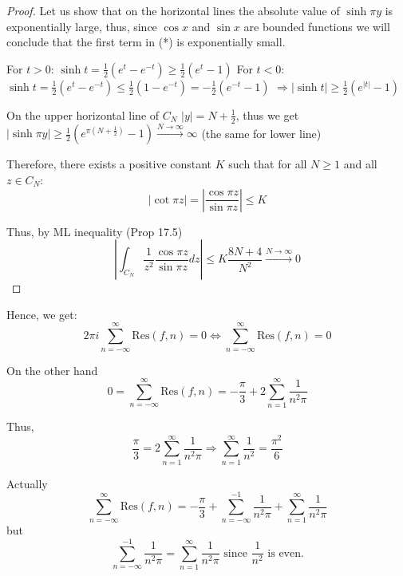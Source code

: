 \begin{soln}
\begin{proof}
Let us show that on the horizontal lines the absolute value of $\sinh \pi y$ is exponentially large, thus, since $\cos x$ and $\sin x$ are bounded functions we will conclude that the first term in (*) is exponentially small.

For $t > 0$: $\sinh t = \frac{1}{2} (e^t - e^{-t}) \ge \frac{1}{2} (e^t - 1)$
For $t < 0$: $\sinh t = \frac{1}{2} (e^t - e^{-t}) \le \frac{1}{2} (1 - e^{-t}) = -\frac{1}{2} (e^{-t} - 1)$
$\Rightarrow |\sinh t| \ge \frac{1}{2} (e^{|t|} - 1)$

On the upper horizontal line of $C_N$ $|y| = N + \frac{1}{2}$, thus we get $|\sinh \pi y| \ge \frac{1}{2} (e^{\pi (N + \frac{1}{2})} - 1) \xrightarrow{N \to \infty} \infty$ (the same for lower line)

Therefore, there exists a positive constant $K$ such that for all $N \ge 1$ and all $z \in C_N$:
\[
    |\cot \pi z| = \left| \frac{\cos \pi z}{\sin \pi z} \right| \le K
    \]
    
    Thus, by ML inequality (Prop 17.5)
    \[ 
        \left| \int_{C_N} \frac{1}{z^2} \frac{\cos \pi z}{\sin \pi z} dz \right| \le K \frac{8N+4}{N^2} \xrightarrow{N \to \infty} 0
        \]
        
    \end{proof}
        
        Hence, we get:
\[
2\pi i \sum_{n=-\infty}^{\infty} \text{Res}(f, n) = 0 \iff \sum_{n=-\infty}^{\infty} \text{Res}(f, n) = 0
\]

On the other hand
\[
0 = \sum_{n=-\infty}^{\infty} \text{Res}(f, n) = -\frac{\pi}{3} + 2 \sum_{n=1}^{\infty} \frac{1}{n^2 \pi}
\]

Thus,
\[
\frac{\pi}{3} = 2 \sum_{n=1}^{\infty} \frac{1}{n^2 \pi} \Rightarrow \sum_{n=1}^{\infty} \frac{1}{n^2} = \frac{\pi^2}{6}
\]
\end{soln}
 Actually
\[
\sum_{n=-\infty}^{\infty} \text{Res}(f, n) = -\frac{\pi}{3} + \sum_{n=-\infty}^{-1} \frac{1}{n^2 \pi} + \sum_{n=1}^{\infty} \frac{1}{n^2 \pi}
\]
but
\[
\sum_{n=-\infty}^{-1} \frac{1}{n^2 \pi} = \sum_{n=1}^{\infty} \frac{1}{n^2 \pi} \text{ since } \frac{1}{n^2} \text{ is even.}
\]
